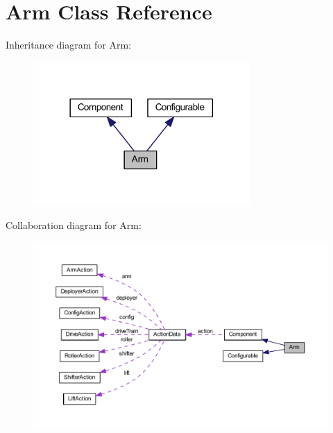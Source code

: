 \hypertarget{class_arm}{
\section{\-Arm \-Class \-Reference}
\label{class_arm}
}


\-Inheritance diagram for \-Arm\-:\nopagebreak
\begin{figure}[H]
\begin{center}
\leavevmode
\includegraphics[width=234pt]{class_arm__inherit__graph}
\end{center}
\end{figure}


\-Collaboration diagram for \-Arm\-:\nopagebreak
\begin{figure}[H]
\begin{center}
\leavevmode
\includegraphics[width=350pt]{class_arm__coll__graph}
\end{center}
\end{figure}
